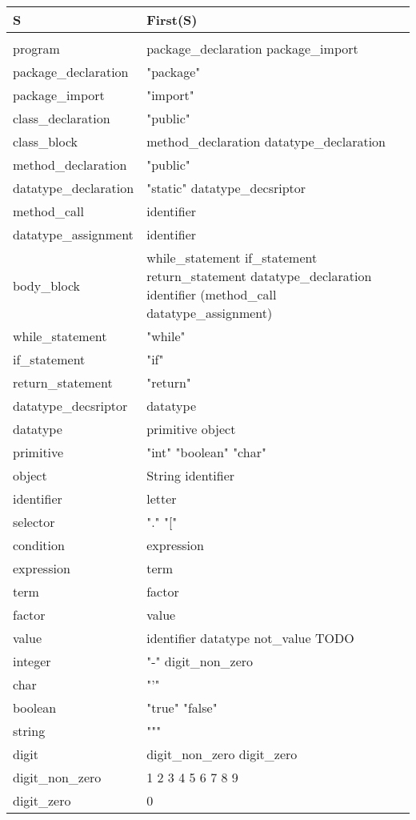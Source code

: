 \begin{tabular}{p{4cm}l}
	S & First(S) \\ \hline
	& \\
	program & package\_declaration package\_import  \\
	package\_declaration & "package" \\
	package\_import & "import" \\
	class\_declaration & "public" \\
	class\_block & method\_declaration datatype\_declaration \\
	method\_declaration & "public" \\
	datatype\_declaration & "static" datatype\_decsriptor \\
	method\_call & identifier \\
	datatype\_assignment & identifier \\
	body\_block & while\_statement if\_statement return\_statement datatype\_declaration identifier (method\_call datatype\_assignment) \\
	while\_statement & "while" \\
	if\_statement & "if" \\
	return\_statement & "return" \\
	datatype\_decsriptor & datatype \\
	datatype & primitive object \\
	primitive & "int" "boolean" "char" \\
	object & String identifier \\
	identifier & letter \\
	selector & "." "[" \\
	condition & expression \\
	expression & term \\
	term & factor \\
	factor & value \\
	value & identifier datatype not\_value TODO \\
	integer & "-" digit\_non\_zero \\
	char & "'"\\
	boolean & "true" "false" \\
	string & """ \\
	digit & digit\_non\_zero digit\_zero \\
	digit\_non\_zero & 1 2 3 4 5 6 7 8 9 \\
	digit\_zero & 0 \\
\end{tabular}